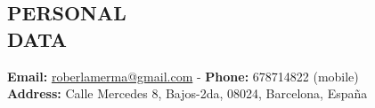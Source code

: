 \documentclass[line,margin]{res}
\begin{document}
\begin{resume}
 
\section{PERSONAL \\ DATA}  
               \textbf{Email:} \href{mailto:roberlamerma@gmail.com}{roberlamerma@gmail.com} - \textbf{Phone:} 678714822 (mobile)\\
               \textbf{Address:} Calle Mercedes 8, Bajos-2da, 08024, Barcelona, Espa\~{n}a\\
               

\end{resume}
\end{document}
